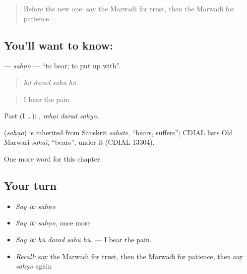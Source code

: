 \label{lesson:MW-C258-sahno}



\begin{quote}
Before the new one: say the Marwadi for trust, then the Marwadi for patience.
\end{quote}

\subsection*{You'll want to know: }
\textbf{} — \emph{sahṇo} — \textquotedblleft{}to bear; to put up with\textquotedblright{}.

\begin{quote}
   
\end{quote}

\begin{quote}
\emph{hū̃ darad sahū̃ hū̃.}
\end{quote}

\begin{quote}
I bear the pain.
\end{quote}

Past (I …):   , \emph{mhaĩ darad sahyo}.

\begin{cousinweb}
\textbf{} (\emph{sahṇo}) is inherited from Sanskrit \emph{sahate}, \textquotedblleft{}bears, suffers\textquotedblright{}; CDIAL lists Old Marwari \emph{sahaï}, \textquotedblleft{}bears\textquotedblright{}, under it (CDIAL 13304).
\end{cousinweb}

\begin{grammarlens}[title={What you've built}]
One more word for this chapter.
\end{grammarlens}

\subsection*{Your turn}
\begin{itemize}
\raggedright
  \item \emph{Say it:} \emph{sahṇo}
  \item \emph{Say it:} \emph{sahṇo}, once more
  \item \emph{Say it:} \emph{hū̃ darad sahū̃ hū̃.} — I bear the pain.
  \item \emph{Recall:} say the Marwadi for trust, then the Marwadi for patience, then say \emph{sahṇo} again
\end{itemize}


